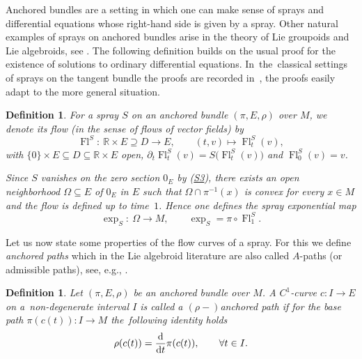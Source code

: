 \documentclass[pdftex]{sigma}
\numberwithin{equation}{section}
\newtheorem{Definition}[Theorem]{Definition}
\newcommand{\R}{\ensuremath{\mathbb{R}}}
\DeclareMathOperator{\Fl}{Fl}
\begin{document}
Anchored bundles are a setting in which one can make sense of sprays and differential equations whose right-hand side is given by a spray.
Other natural examples of sprays on anchored bundles arise in the theory of Lie groupoids and Lie algebroids, see \cite{CaMaS20,CaF03}.
The following definition builds on the usual proof for the existence of solutions to ordinary differential equations. In~the~classical settings of sprays on the tangent bundle the proofs are recorded in~\mbox{\cite[Chapter~IV, Section~4]{La01}}, the proofs easily adapt to the more general situation.

\begin{Definition}
For a spray $S$ on an anchored bundle $(\pi,E,\rho)$ over $M$, we denote its \emph{flow} (in the sense of flows of vector fields) by{\samepage
\begin{displaymath}
 \Fl^S \colon\ \R \times E \supseteq D \rightarrow E,\qquad (t,v) \mapsto \Fl_t^S (v),\end{displaymath} with $\{0\}\times E \subseteq D\subseteq \R \times E$ open, $\partial_t \Fl_{t}^{S}(v) = S\bigl(\Fl_{t}^{S}(v)\bigr)$ and $\Fl_0^S(v)=v$.}

Since $S$ vanishes on the zero section $0_E$ by (\hyperlink{sprayS3}{S3}), there exists an open neighborhood $\Omega \subseteq E$ of $0_E$ in $E$ such that $\Omega \cap \pi^{-1}(x)$ is convex for every $x \in M$ and the flow is defined up to time~$1$. Hence one defines the \emph{spray exponential map}
\begin{displaymath}\exp_S \colon\ \Omega \rightarrow M,\qquad \exp_S = \pi \circ \Fl^S_1.\end{displaymath}
\end{Definition}

Let us now state some properties of the flow curves of a spray. For this we define \emph{anchored paths} which in the Lie algebroid literature are also called $A$-paths (or admissible paths), see, e.g., \cite[\S1.1]{CaF03}.

\begin{Definition}
Let $(\pi,E,\rho)$ be an anchored bundle over $M$. A $C^1$-curve $c \colon I \rightarrow E$ on a~non-degenerate interval $I$ is called a $(\rho-)$\emph{anchored path} if for the base path $\pi (c(t))\colon I \rightarrow M$ the~following identity holds
\begin{displaymath}\rho(c(t))=\frac{{\rm d}}{{\rm d}t} \pi (c(t)), \qquad \forall t \in I.
\end{displaymath}
\end{Definition}
\end{document}
